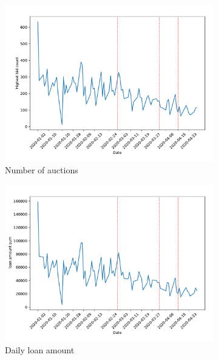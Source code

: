 \documentclass[11pt,a4paper]{article}
\begin{document}
\pagebreak

\begin{figure}[h]
  \centering
  \begin{subfigure}[b]{0.49\textwidth}
      \includegraphics[width=0.998\textwidth]{../results/figures/winner_bid_count_mat30_loan1_timeseries_nr_4_4.75.pdf}
      \caption{ Number of auctions}
     \end{subfigure}
     \begin{subfigure}[b]{0.49\textwidth}
      \includegraphics[width=0.998\textwidth]{../results/figures/LoanAmount_sum_mat30_loan1_timeseries_nr_4_4.75.pdf}
      \caption{ Daily loan amount}
     \end{subfigure}
     \begin{subfigure}[b]{0.49\textwidth}

\end{subfigure}
\end{figure}
\end{document}
